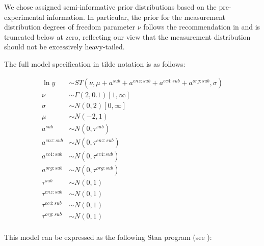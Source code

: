 \documentclass[11pt]{article}
\begin{document}
We chose assigned semi-informative prior distributions based on the
pre-experimental information. In particular, the prior for the measurement
distribution degrees of freedom parameter \(\nu\) follows the recommendation in  and is truncated below at
zero, reflecting our view that the measurement distribution should not be
excessively heavy-tailed.

The full model specification in tilde notation is as follows:

\begin{align*}
\ln y &\sim ST(\nu,
               \mu + a^{sub} + a^{enz:sub} + a^{ec4:sub} + a^{org:sub},
               \sigma) \\
\nu &\sim \Gamma(2, 0.1)[1, \infty] \\
\sigma &\sim N(0, 2)[0, \infty] \\
\mu &\sim N(-2, 1) \\
a^{sub} &\sim N(0, \tau^{sub}) \\
a^{enz:sub} &\sim N(0, \tau^{enz:sub}) \\
a^{ec4:sub} &\sim N(0, \tau^{ec4:sub}) \\
a^{org:sub} &\sim N(0, \tau^{org:sub}) \\
\tau^{sub} &\sim N(0, 1) \\
\tau^{enz:sub} &\sim N(0, 1) \\
\tau^{ec4:sub} &\sim N(0, 1) \\
\tau^{org:sub} &\sim N(0, 1) \\
\end{align*}

This model can be expressed as the following Stan program (see ):
\end{document}
